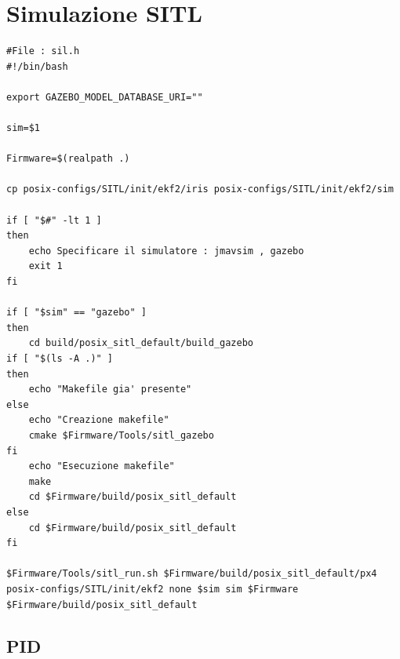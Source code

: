 \section{Simulazione SITL}
\begin{lstlisting}
#File : sil.h
#!/bin/bash

export GAZEBO_MODEL_DATABASE_URI=""

sim=$1

Firmware=$(realpath .)

cp posix-configs/SITL/init/ekf2/iris posix-configs/SITL/init/ekf2/sim

if [ "$#" -lt 1 ]
then
	echo Specificare il simulatore : jmavsim , gazebo
	exit 1
fi

if [ "$sim" == "gazebo" ] 
then
	cd build/posix_sitl_default/build_gazebo
if [ "$(ls -A .)" ]
then
	echo "Makefile gia' presente"
else
	echo "Creazione makefile"
	cmake $Firmware/Tools/sitl_gazebo
fi
	echo "Esecuzione makefile"
	make
	cd $Firmware/build/posix_sitl_default
else
	cd $Firmware/build/posix_sitl_default
fi

$Firmware/Tools/sitl_run.sh $Firmware/build/posix_sitl_default/px4  posix-configs/SITL/init/ekf2 none $sim sim $Firmware $Firmware/build/posix_sitl_default
\end{lstlisting}

\subsection{PID}

